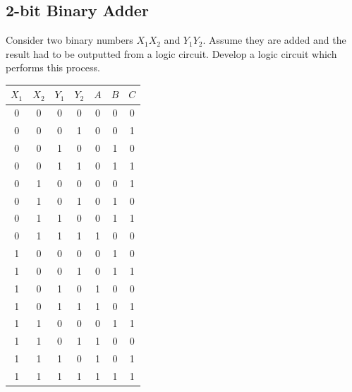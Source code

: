 \documentclass[12pt, a4paper]{report}
\begin{document}
\subsection{2-bit Binary Adder}
Consider two binary numbers $X_1X_2$ and $Y_1Y_2$. Assume they are added and the result had to be outputted from a logic circuit. Develop a logic circuit which performs this process.
\begin{center}
\begin{tabular}{c|c|c|c||c|c|c}
	$X_1$ & $X_2$ & $Y_1$ & $Y_2$ & $A$ & $B$ & $C$ \\ \hline
	0     & 0     & 0     & 0     & 0   & 0   & 0   \\ \hline
	0     & 0     & 0     & 1     & 0   & 0   & 1   \\ \hline
	0     & 0     & 1     & 0     & 0   & 1   & 0   \\ \hline
	0     & 0     & 1     & 1     & 0   & 1   & 1   \\ \hline
	0     & 1     & 0     & 0     & 0   & 0   & 1   \\ \hline
	0     & 1     & 0     & 1     & 0   & 1   & 0   \\ \hline
	0     & 1     & 1     & 0     & 0   & 1   & 1   \\ \hline
	0     & 1     & 1     & 1     & 1   & 0   & 0   \\ \hline
	1     & 0     & 0     & 0     & 0   & 1   & 0   \\ \hline
	1     & 0     & 0     & 1     & 0   & 1   & 1   \\ \hline
	1     & 0     & 1     & 0     & 1   & 0   & 0   \\ \hline
	1     & 0     & 1     & 1     & 1   & 0   & 1   \\ \hline
	1     & 1     & 0     & 0     & 0   & 1   & 1   \\ \hline
	1     & 1     & 0     & 1     & 1   & 0   & 0   \\ \hline
	1     & 1     & 1     & 0     & 1   & 0   & 1   \\ \hline
	1     & 1     & 1     & 1     & 1   & 1   & 1  
\end{tabular}
\end{center}
\end{document}
